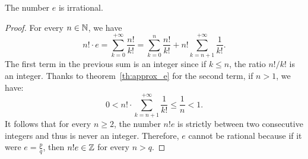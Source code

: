 \begin{theorem}[Irrationality of $e$]
%
%
\mymark{**}%
%
%
The number $e$ is irrational.
\end{theorem}
%
\begin{proof}
For every $n\in {\mathbb N}$, we have 
\[
  n! \cdot e = \sum_{k=0}^{+\infty} \frac{n!}{k!}
   = \sum_{k=0}^n \frac{n!}{k!} + n!\sum_{k=n+1}^{+\infty} \frac{1}{k!}.
\]
The first term in the previous sum is an integer
since if $k\le n$, the ratio $n!/k!$ is an integer.
Thanks to theorem~\ref{th:approx_e}
for the second term, if $n>1$, we have:
\[
0 < n! \cdot \sum_{k=n+1}^{+\infty} \frac{1}{k!}
\le \frac{1}{n} < 1.
\]
It follows that for every $n\ge 2$, the number $n! e$
is strictly between two consecutive integers and thus is never 
an integer. Therefore, $e$ cannot be rational because 
if it were $e=\frac p q$, then $n! e \in {\mathbb Z}$ for every 
$n>q$.
\end{proof}